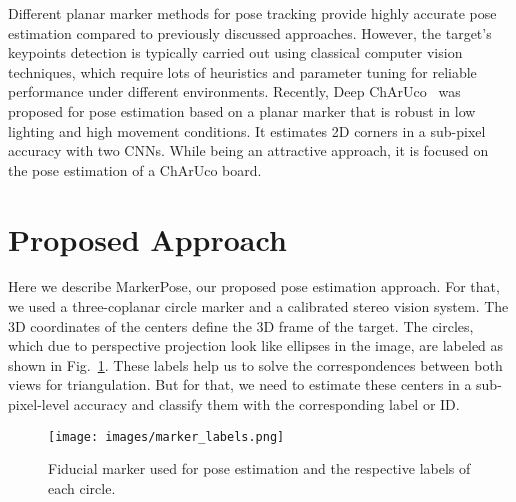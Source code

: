 \documentclass[final]{cvpr}
\begin{document}
Different planar marker methods for pose tracking provide highly accurate pose estimation compared to previously discussed approaches. However, the target's keypoints detection is typically carried out using classical computer vision techniques, which require lots of heuristics and parameter tuning for reliable performance under different environments. Recently, Deep ChArUco~\cite{hu2019deep} was proposed for pose estimation based on a planar marker that is robust in low lighting and high movement conditions. It estimates 2D corners in a sub-pixel accuracy with two CNNs. While being an attractive approach, it is focused on the pose estimation of a ChArUco board.




\section{Proposed Approach}
Here we describe MarkerPose, our proposed pose estimation approach. For that, we used a three-coplanar circle marker and a calibrated stereo vision system. The 3D coordinates of the centers define the 3D frame of the target. The circles, which due to perspective projection look like ellipses in the image, are labeled as shown in Fig.~\ref{fig:marker_labels}. These labels help us to solve the correspondences between both views for triangulation. But for that, we need to estimate these centers in a sub-pixel-level accuracy and classify them with the corresponding label or ID.

\begin{figure}[h]
    \centering
    \texttt{[image: images/marker\_labels.png]}
    \caption{Fiducial marker used for pose estimation and the respective labels of each circle.}
    \label{fig:marker_labels}
\end{figure}
\end{document}
